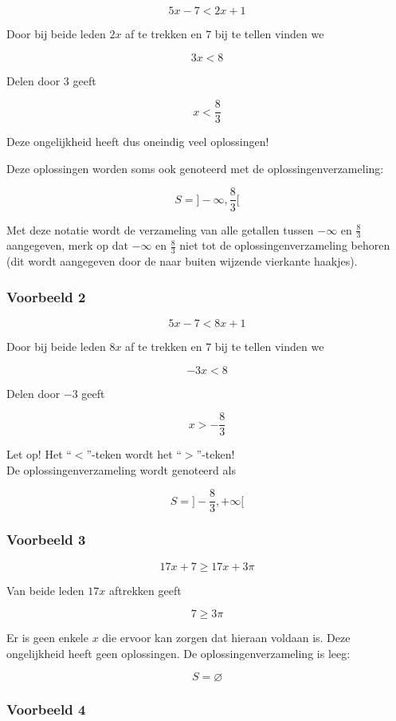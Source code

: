 \[ 5x-7 < 2x+1 \]

Door bij beide leden $2x$ af te trekken en $7$ bij te tellen vinden we

\[ 3x<8 \]

Delen door $3$ geeft

\[ x< \frac{8}{3} \]

Deze ongelijkheid heeft dus oneindig veel oplossingen!

Deze oplossingen worden soms ook genoteerd met de oplossingenverzameling:

\[ S=] -\infty, \frac{8}{3} [ \]

Met deze notatie wordt de verzameling van alle getallen tussen $-\infty$ en $\frac{8}{3}$ aangegeven, merk op dat $-\infty$ en $\frac{8}{3}$ niet tot de oplossingenverzameling behoren (dit wordt aangegeven door de naar buiten wijzende vierkante haakjes).

\subsubsection{Voorbeeld 2}

\[ 5x-7 < 8x+1 \]

Door bij beide leden $8x$ af te trekken en $7$ bij te tellen vinden we

\[ -3x<8 \]

Delen door $-3$ geeft

\[ x> -\frac{8}{3} \]

Let op! Het ``$<$''-teken wordt het ``$>$''-teken!\\

De oplossingenverzameling wordt genoteerd als

\[ S=]-\frac{8}{3}, +\infty [ \]

\subsubsection{Voorbeeld 3}

\[ 17x+7 \geq 17x+3\pi \]

Van beide leden $17x$ aftrekken geeft

\[ 7 \geq 3 \pi \]

Er is geen enkele $x$ die ervoor kan zorgen dat hieraan voldaan is. Deze ongelijkheid heeft geen oplossingen. De oplossingenverzameling is leeg:

\[ S=\varnothing \]


\subsubsection{Voorbeeld 4}

